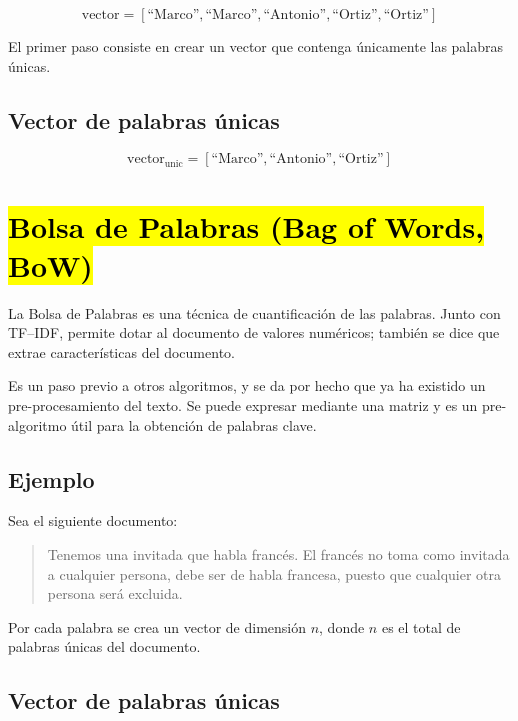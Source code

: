 \documentclass[12pt]{article}
\begin{document}
\begin{equation}
\text{vector} = [\text{``Marco''}, \text{``Marco''}, \text{``Antonio''}, \text{``Ortiz''}, \text{``Ortiz''}]
\end{equation}

El primer paso consiste en crear un vector que contenga únicamente las palabras únicas.

\subsection*{Vector de palabras únicas}

\begin{equation}
\text{vector}_\text{unic} = [\text{``Marco''}, \text{``Antonio''}, \text{``Ortiz''}]
\end{equation}

\section*{\hl{Bolsa de Palabras (Bag of Words, BoW)}}

La Bolsa de Palabras es una técnica de cuantificación de las palabras.  
Junto con TF--IDF, permite dotar al documento de valores numéricos; también se dice que extrae características del documento.

Es un paso previo a otros algoritmos, y se da por hecho que ya ha existido un pre-procesamiento del texto.  
Se puede expresar mediante una matriz y es un pre-algoritmo útil para la obtención de palabras clave.

\subsection*{Ejemplo}

Sea el siguiente documento:

\begin{quote}
Tenemos una invitada que habla francés.  
El francés no toma como invitada a cualquier persona, debe ser de habla francesa, puesto que cualquier otra persona será excluida.
\end{quote}

Por cada palabra se crea un vector de dimensión $n$, donde $n$ es el total de palabras únicas del documento.

\subsection*{Vector de palabras únicas}
\end{document}
